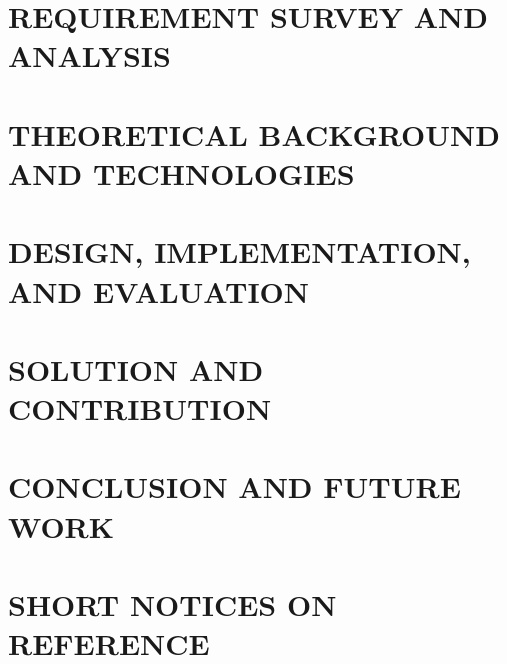 \documentclass[a4paper,12pt,oneside]{report}
\renewcommand{\bibname}{reference}
\renewcommand{\figurename}{Figure}
\renewcommand{\tablename}{Table}
\renewcommand{\chaptername}{CHAPTER}
\theoremstyle{definition}
\begin{document}
\chapter{REQUIREMENT SURVEY AND ANALYSIS}
\label{chapter:Related_works}



\newpage
\chapter{THEORETICAL BACKGROUND AND TECHNOLOGIES}
\label{chapter:Methodology}


\newpage
\chapter{DESIGN, IMPLEMENTATION, AND EVALUATION}
\label{chapter:Experiment}


\newpage
\chapter{SOLUTION AND CONTRIBUTION}
\label{chapter:SolutionAndContribution}

\newpage
\chapter{CONCLUSION AND FUTURE WORK} %
\label{chapter:conclusion}


\newpage
\chapter*{SHORT NOTICES ON REFERENCE} %
\label{chapter:reference}



\newpage
\renewcommand\bibname{REFERENCE}
\nocite{*}
\printbibliography
{}

\appendixpage
\appendix
\addappheadtotoc
\renewcommand{\figurename}{Figure}
\renewcommand{\tablename}{Table}
\renewcommand{\chaptername}{CHAPTER}

\end{document}
